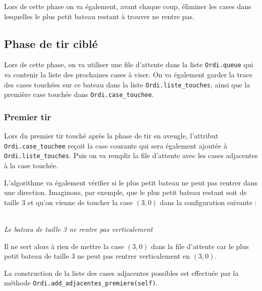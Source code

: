 Lors de cette phase on va également, avant chaque coup, éliminer les cases dans lesquelles le plus petit bateau restant à trouver ne rentre pas.

\subsection{Phase de tir ciblé}
Lors de cette phase, on va utiliser une file d'attente dans la liste \texttt{Ordi.queue} qui va contenir la liste des prochaines cases à viser. On va également garder la trace des cases touchées sur ce bateau dans la liste \texttt{Ordi.liste\_touches}, ainsi que la première case touchée dans \texttt{Ordi.case\_touchee}.
\subsubsection{Premier tir}
Lors du premier tir touché après la phase de tir en aveugle, l'attribut \texttt{Ordi.case\_touchee} reçoit la case courante qui sera également ajoutée à \texttt{Ordi.liste\_touches}. Puis on va remplir la file d'attente avec les cases adjacentes à la case touchée.

L'algorithme va également vérifier si le plus petit bateau ne peut pas rentrer dans une direction. Imaginons, par exemple, que le plus petit bateau restant soit de taille 3 et qu'on vienne de toucher la case $(3,0)$ dans la configuration suivante :

\begin{center}
\\
\textit{Le bateau de taille 3 ne rentre pas verticalement}
\end{center}
Il ne sert alors à rien de mettre la case $(3,0)$ dans la file d'attente car le plus petit bateau de taille 3 ne peut pas rentrer verticalement en $(3,0)$.

La construction de la liste des cases adjacentes possibles est effectuée par la méthode \texttt{Ordi.add\_adjacentes\_premiere(self)}.

